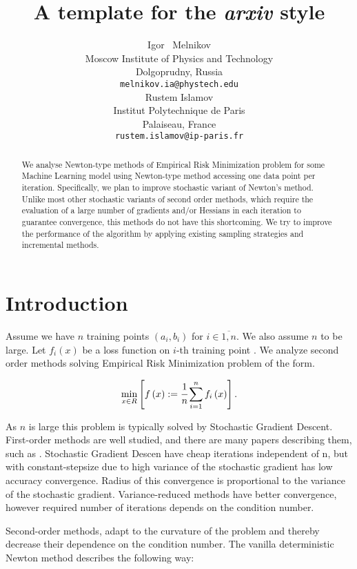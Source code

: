 \documentclass{article}
\title{A template for the \emph{arxiv} style}
\author{ Igor ~Melnikov	\\
	Moscow Institute of Physics and Technology\\
	Dolgoprudny, Russia \\
	\texttt{melnikov.ia@phystech.edu} \\
	\And
	Rustem Islamov \\
	Institut Polytechnique de Paris\\
	Palaiseau, France \\
	\texttt{rustem.islamov@ip-paris.fr} \\
}
\date{}
\begin{document}
\maketitle

\begin{abstract}
We analyse Newton-type methods of Empirical Risk Minimization problem for some Machine Learning model using Newton-type method accessing one data point per iteration. Specifically, we plan to improve stochastic variant of Newton’s method. Unlike most other stochastic variants of second order methods, which require the evaluation of a large number of gradients and/or Hessians in each iteration to guarantee convergence, this methods do not have this shortcoming. We try to improve the performance of the algorithm by applying existing sampling strategies and incremental methods.
\end{abstract}

\section{Introduction}

Assume we have $n$ training points $\left(a_i, b_i\right)$ for $i \in \overline{1, n}$. We also assume $n$ to be large. Let $f_i\left(x\right)$ be a loss function on $i$-th training point . We analyze second order methods solving Empirical Risk Minimization problem of the form.

\begin{equation}
    \min\limits_{x\in R} \left[f\left(x\right):=\cfrac{1}{n}\sum\limits_{i=1}^{n}f_i\left(x\right)\right].
\end{equation}

As $n$ is large this problem is typically solved by Stochastic Gradient Descent. First-order methods are well studied, and there are many papers describing them, such as \cite{litlink1}. Stochastic Gradient Descen have cheap iterations independent of n, but with constant-stepsize due to high variance of the stochastic gradient has low accuracy convergence. Radius of this convergence is proportional to the variance of the stochastic gradient. 
Variance-reduced methods \cite{litlink2} have better convergence, however required number of iterations depends on the condition number. 

Second-order methods, adapt to the curvature of the problem and thereby decrease their dependence on the condition number. The vanilla deterministic Newton method describes the following way:
\end{document}
